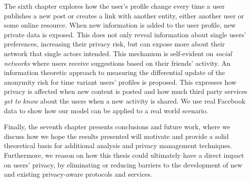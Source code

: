 The sixth chapter explores how the user's profile change every time a user publishes a new post or creates a link with another entity, either another user or some online resource. When new information is added to the user profile, new private data is exposed. This does not only reveal information about single users' preferences, increasing their privacy risk, but can expose more about their network that single actors intended. This mechanism is self-evident on \emph{social networks} where users receive suggestions based on their friends’ activity. An information theoretic approach to measuring the differential update of the anonymity risk for time variant users’ profiles is proposed. This expresses how privacy is affected when new content is posted and how much third party services \emph{get to know} about the users when a new activity is shared. We use real Facebook data to show how our model can be applied to a real world scenario.

Finally, the seventh chapter presents conclusions and future work, where we discuss how we hope the results presented will motivate and provide a solid theoretical basis for additional analysis and privacy management techniques. Furthermore, we reason on how this thesis could ultimately have a direct impact on users' privacy, by eliminating or reducing barriers to the development of new and existing privacy-aware protocols and services.